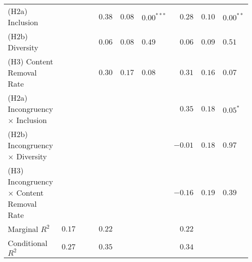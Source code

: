 \begin{table*}[t!]
\begin{tabular}{lrrlrrlrrl}
    (H2a) Inclusion & & & & $0.38$ & $0.08$ & $0.00^{***}$ & $0.28$ & $0.10$ & $0.00^{**}$\\
    (H2b) Diversity & & & & $0.06$ & $0.08$ & $0.49$ & $0.06$ & $0.09$ & $0.51$\\
    (H3) Content Removal Rate & & & & $0.30$ & $0.17$ & $0.08$ & $0.31$ & $0.16$ &$0.07$\\ \addlinespace
    (H2a) Incongruency $\times$ Inclusion  & & & & & & & $0.35$ & $0.18$ & $0.05^{*}$\\
    (H2b) Incongruency $\times$ Diversity & & & & & & & $-0.01$ & $0.18$ & $0.97$\\
    (H3) Incongruency $\times$ Content Removal Rate & & & & & & & $-0.16$ & $0.19$ & $0.39$\\
    \midrule
    Marginal $R^2$ & $0.17$ & & & $0.22$ & & & $0.22$\\
    Conditional $R^2$ & $0.27$ & & & $0.35$ & & & $0.34$\\
    \bottomrule
    \end{tabular}
    \label{tab:model1}
\end{table*}
